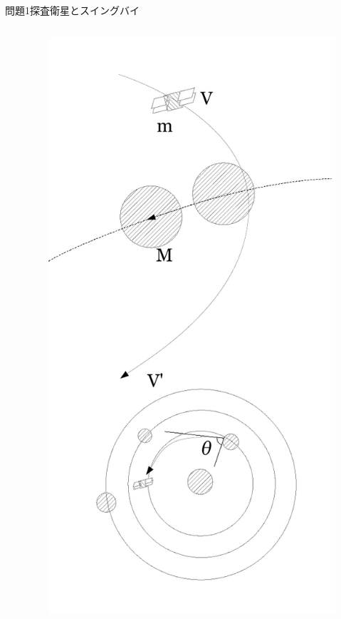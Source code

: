 \documentclass[dvipdfmx]{beamer}
\begin{document}
\begin{frame}{問題1}{探査衛星とスイングバイ}
\begin{columns}[t]
\begin{column}{0.7\textwidth}
\end{column}
\begin{column}{0.3\textwidth}
\begin{figure}[htbp]
    \centering
    \includegraphics[bb=0mm 0mm 100.0mm 170.0mm, scale=0.35, type=pdf]{img/problem1.pdf}
\end{figure}
\end{column}
\end{columns}
\end{frame}
\end{document}
